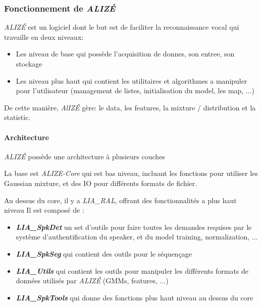 \subsubsection*{Fonctionnement de \textit{ALIZÉ}}
\textit{ALIZÉ} est un logiciel dont le but est de faciliter la reconnaissance vocal qui travaille en deux niveaux:
\begin{itemize}
    \item Les niveau de base qui possède l'acquisition de donnes, son entree, son stockage
    \item Les niveau plus haut qui contient les utilitaires et algorithmes a manipuler pour l'utilisateur (management de listes, initialisation du model, les map, ...)
\end{itemize}

De cette manière, \textit{AlIZÉ} gère: le data, les features,  la mixture / distribution et la statistic.

\paragraph*{Architecture}

\textit{ALIZÉ} possède une architecture à plusieurs couches

La base est \textit{ALIZE-Core} qui est bas niveau, incluant les fonctions pour utiliser les Gaussian mixture, et des IO pour différents formats de fichier.

Au dessus du core, il y a \textit{LIA\_RAL}, offrant des fonctionnalités a plus haut niveau
Il est composé de :
\begin{itemize}
    \item \textbf{\textit{LIA\_SpkDet}}  un set d'outils pour faire toutes les demandes requises par le système d'authentification du speaker, et du model training, normalization, ...
    \item \textbf{\textit{LIA\_SpkSeg}}  qui contient des outils pour le séquençage
    \item \textbf{\textit{LIA\_Utils}}  qui contient les outils pour manipuler les différents formats de données utilisés par \textit{ALIZÉ} (GMMs, features, ...)
    \item \textbf{\textit{LIA\_SpkTools}}  qui donne des fonctions plus haut niveau au dessus du core

\end{itemize}


